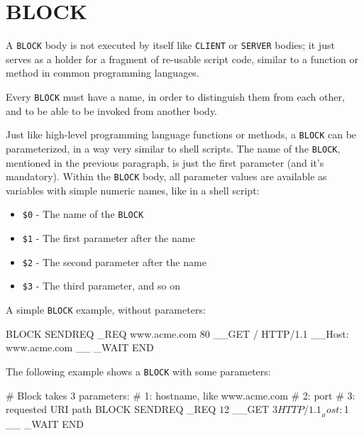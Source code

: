 \newpage
\section{BLOCK}
\label{chap:block}

A \texttt{BLOCK} body is not executed by itself like \texttt{CLIENT} or 
\texttt{SERVER} bodies; it just serves as a holder for a fragment of 
re-usable script code, similar to a function or method in common 
programming languages.

Every \texttt{BLOCK} must have a name, in order to distinguish them from 
each other, and to be able to be invoked from another body.

Just like high-level programming language functions or methods, 
a \texttt{BLOCK} can be parameterized, in a way 
very similar to shell scripts. The name of the \texttt{BLOCK}, mentioned 
in the previous paragraph, is just the first parameter (and it's 
mandatory). Within the \texttt{BLOCK} body, all parameter values are 
available as variables with simple numeric names, like in a shell script:

\begin{itemize}
  \item \texttt{\$0} - The name of the \texttt{BLOCK}
  \item \texttt{\$1} - The first parameter after the name
  \item \texttt{\$2} - The second parameter after the name
  \item \texttt{\$3} - The third parameter, and so on
\end{itemize}

A simple \texttt{BLOCK} example, without parameters:

\begin{usplisting}
    BLOCK SENDREQ
    _REQ www.acme.com 80
    __GET / HTTP/1.1
    __Host: www.acme.com
    __
    _WAIT
    END
\end{usplisting}

The following example shows a \texttt{BLOCK} with some parameters:

\begin{usplisting}
    # Block takes 3 parameters:
    # 1: hostname, like www.acme.com
    # 2: port
    # 3: requested URI path
    BLOCK SENDREQ
    _REQ $1 $2
    __GET $3 HTTP/1.1
    __Host: $1
    __
    _WAIT
    END
\end{usplisting}

